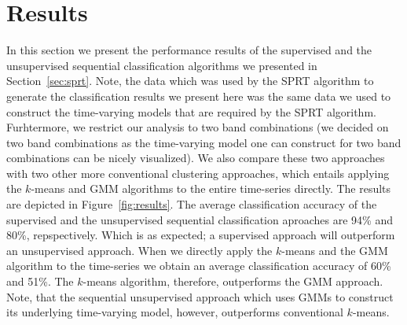 \documentclass{article}
\begin{document}
\section{Results}
In this section we present the performance results of the supervised and the unsupervised sequential classification algorithms we presented in Section~\ref{sec:sprt}.
Note, the data which was used by the SPRT algorithm to generate the classification results we present here was the same data we used to construct the time-varying models that are required by the SPRT algorithm.  
Furhtermore, we restrict our analysis to two band combinations (we decided on two band combinations as the time-varying model 
one can construct for two band combinations can be nicely visualized). We also compare these two approaches with two other more conventional clustering approaches, which entails applying the $k$-means and GMM algorithms to the entire time-series directly.
The results are depicted in Figure~\ref{fig:results}. The average classification accuracy of the supervised and the unsupervised sequential classification aproaches are 94\% and 80\%, repspectively. Which is 
as expected; a supervised approach will outperform an unsupervised approach. When we directly apply the $k$-means and the GMM algorithm to the time-series we obtain 
an average classification accuracy of 60\% and 51\%. The $k$-means algorithm, therefore, outperforms the GMM approach. Note, that the sequential unsupervised approach which uses 
GMMs to construct its underlying time-varying model, however, outperforms conventional $k$-means. 
\end{document}
